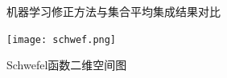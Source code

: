 \begin{figure}[H] %
\label{Fig:easmresut}
 \centering

 \caption{机器学习修正方法与集合平均集成结果对比}
 \end{figure}

\begin{figure}[H] %
  \centering
  \texttt{[image: schwef.png]}
  \caption{Schwefel函数二维空间图}
  \label{fig:xfig1}
\end{figure}

